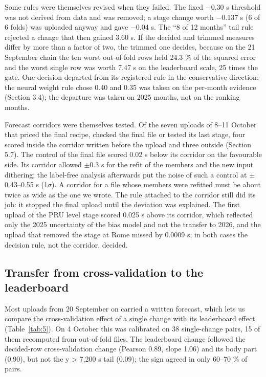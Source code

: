 \documentclass[11pt,a4paper]{article}
\begin{document}
Some rules were themselves revised when they failed. The fixed $-$0.30 s threshold was not derived from data and was removed; a stage change worth $-$0.137 s (6 of 6 folds) was uploaded anyway and gave $-$0.04 s. The ``8 of 12 months'' tail rule rejected a change that then gained 3.60 s. If the decided and trimmed measures differ by more than a factor of two, the trimmed one decides, because on the 21 September chain the ten worst out-of-fold rows held 24.3 \% of the squared error and the worst single row was worth 7.47 s on the leaderboard scale, 25 times the gate. One decision departed from its registered rule in the conservative direction: the neural weight rule chose 0.40 and 0.35 was taken on the per-month evidence (Section 3.4); the departure was taken on 2025 months, not on the ranking months.

Forecast corridors were themselves tested. Of the seven uploads of 8--11 October that priced the final recipe, checked the final file or tested its last stage, four scored inside the corridor written before the upload and three outside (Section 5.7). The control of the final file scored 0.02 s below its corridor on the favourable side. Its corridor allowed $\pm$0.3 s for the refit of the members and the new input dithering; the label-free analysis afterwards put the noise of such a control at $\pm$0.43--0.55 s (1$\sigma$). A corridor for a file whose members were refitted must be about twice as wide as the one we wrote. The rule attached to the corridor still did its job: it stopped the final upload until the deviation was explained. The first upload of the PRU level stage scored 0.025 s above its corridor, which reflected only the 2025 uncertainty of the bias model and not the transfer to 2026, and the upload that removed the stage at Rome missed by 0.0009 s; in both cases the decision rule, not the corridor, decided.

\subsection{Transfer from cross-validation to the leaderboard}\label{transfer-from-cross-validation-to-the-leaderboard}

Most uploads from 20 September on carried a written forecast, which lets us compare the cross-validation effect of a single change with its leaderboard effect (Table~\ref{tab:5}). On 4 October this was calibrated on 38 single-change pairs, 15 of them recomputed from out-of-fold files. The leaderboard change followed the decided-row cross-validation change (Pearson 0.89, slope 1.06) and its body part (0.90), but not the y \textgreater{} 7,200 s tail (0.09); the sign agreed in only 60--70 \% of pairs.
\end{document}
